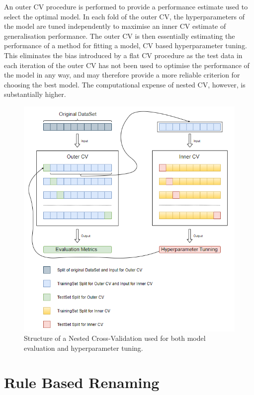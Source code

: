 An outer CV procedure is performed to provide a performance estimate used to select the optimal model. In each fold of the outer CV, the hyperparameters of the model are tuned independently to maximise an inner CV estimate of generalisation performance. The outer CV is then essentially estimating the performance of a method for fitting a model, CV based hyperparameter tuning. This eliminates the bias introduced by a flat CV procedure as the test data in each iteration of the outer CV has not been used to optimise the performance of the model in any way, and may therefore provide a more reliable criterion for choosing the best model. The computational expense of nested CV, however, is substantially higher. 


\begin{figure}[H]
  \centering
  \includegraphics[scale=0.75]{Images/nested_cv.png}
  \caption{Structure of a Nested Cross-Validation used for both model evaluation and hyperparameter tuning.}
  \label{NestedCV}
\end{figure}

\section{Rule Based Renaming}


